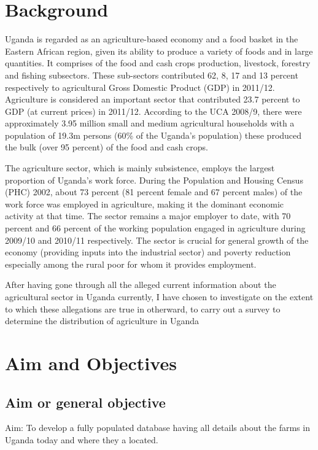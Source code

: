 \documentclass{article}
\begin{document}
\section{Background}

Uganda is regarded as an agriculture-based economy and a food basket in the Eastern 
African region, given its ability to produce a variety of foods and in large quantities.    It 
comprises of the food and cash crops production,  livestock,  forestry  and  fishing  subsectors.    These  sub-sectors  contributed  62,  8,  17  and  13  percent  respectively  to 
agricultural  Gross  Domestic  Product  (GDP)  in  2011/12.    Agriculture  is  considered  an 
important  sector  that  contributed  23.7  percent  to  GDP  (at  current  prices)  in  2011/12. 
According to the  UCA  2008/9, there were approximately 3.95 million small and medium 
agricultural  households  with  a  population  of  19.3m  persons  (60\%  of  the  Uganda’s 
population) these produced the bulk (over 95 percent) of the food and cash crops.

The  agriculture  sector,  which  is  mainly  subsistence,  employs  the  largest  proportion  of 
Uganda’s work force. During the  Population and Housing Census (PHC)  2002,  about  73 
percent  (81  percent  female  and  67  percent  males)  of  the  work  force  was  employed  in 
agriculture,  making it the dominant  economic activity at that time.    The sector  remains  a
major  employer  to  date,  with  70  percent  and  66  percent  of  the  working  population 
engaged in agriculture during 2009/10 and 2010/11 respectively.  The sector is crucial for 
general  growth  of the  economy  (providing  inputs  into  the  industrial  sector)  and  poverty 
reduction especially among the rural poor for whom it provides employment.

After having gone through all the alleged current information about the agricultural sector in Uganda currently, I have chosen to investigate on the extent to which these allegations are true in otherward, to carry out a survey to determine the distribution of agriculture in Uganda


\section{Aim and Objectives}\label{sec:aimsandobjectives}
\subsection{Aim or general objective}
Aim:  To develop a fully populated database having all details about the farms in Uganda today and where they a located.
\end{document}
